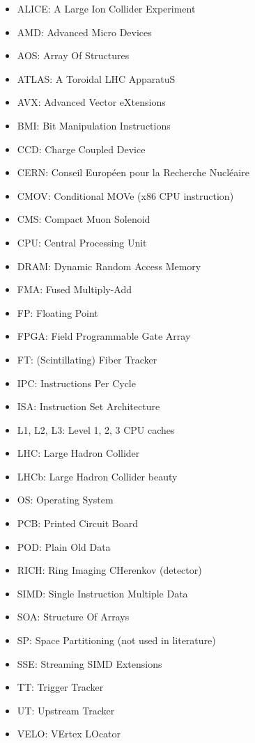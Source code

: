 \documentclass[12pt]{article}
\begin{document}
\begin{itemize}
	\item ALICE: A Large Ion Collider Experiment
	\item AMD: Advanced Micro Devices
	\item AOS: Array Of Structures
	\item ATLAS: A Toroidal LHC ApparatuS
	\item AVX: Advanced Vector eXtensions
	\item BMI: Bit Manipulation Instructions
	\item CCD: Charge Coupled Device
	\item CERN:  Conseil Européen pour la Recherche Nucléaire
	\item CMOV: Conditional MOVe (x86 CPU instruction)
	\item CMS: Compact Muon Solenoid
	\item CPU: Central Processing Unit
	\item DRAM: Dynamic Random Access Memory
	\item FMA: Fused Multiply-Add
	\item FP: Floating Point
	\item FPGA: Field Programmable Gate Array
	\item FT: (Scintillating) Fiber Tracker
	\item IPC: Instructions Per Cycle
	\item ISA: Instruction Set Architecture
	\item L1, L2, L3: Level 1, 2, 3 CPU caches
	\item LHC: Large Hadron Collider
	\item LHCb: Large Hadron Collider beauty
	\item OS: Operating System
	\item PCB: Printed Circuit Board
	\item POD: Plain Old Data
	\item RICH: Ring Imaging CHerenkov (detector)
	\item SIMD: Single Instruction Multiple Data
	\item SOA: Structure Of Arrays
	\item SP: Space Partitioning (not used in literature)
	\item SSE: Streaming SIMD Extensions 
	\item TT: Trigger Tracker
	\item UT: Upstream Tracker
	\item VELO: VErtex LOcator
\end{itemize}
\end{document}
